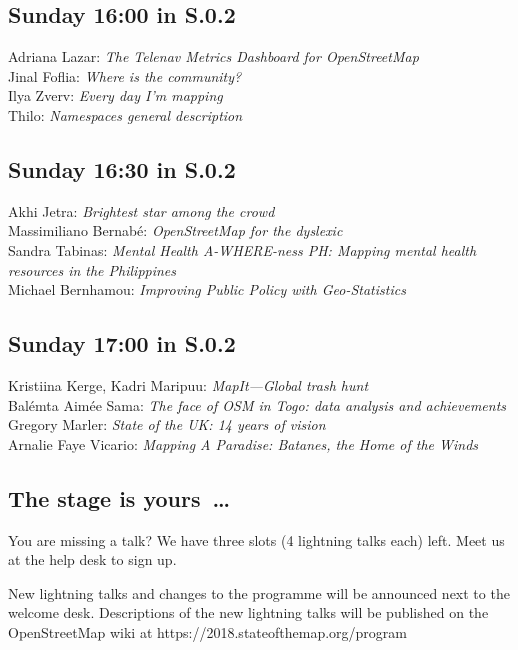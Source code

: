 \subsection*{Sunday 16:00 in S.0.2}
Adriana Lazar: \emph{The Telenav Metrics Dashboard for OpenStreetMap}\\
Jinal Foflia: \emph{Where is the community?}\\
Ilya Zverv: \emph{Every day I'm mapping}\\
Thilo: \emph{Namespaces general description}

\subsection*{Sunday 16:30 in S.0.2}
Akhi Jetra: \emph{Brightest star among the crowd}\\
Massimiliano Bernabé: \emph{OpenStreetMap for the dyslexic}\\
Sandra Tabinas: \emph{Mental Health A-WHERE-ness PH: Mapping mental health resources in the Philippines}\\
Michael Bernhamou: \emph{Improving Public Policy with Geo-Statistics}

\subsection*{Sunday 17:00 in S.0.2}
Kristiina Kerge, Kadri Maripuu: \emph{MapIt---Global trash hunt}\\
Balémta Aimée Sama: \emph{The face of OSM in Togo: data analysis and achievements}\\
Gregory Marler: \emph{State of the UK: 14 years of vision}\\
Arnalie Faye Vicario: \emph{Mapping A Paradise: Batanes, the Home of the Winds}

\subsection*{The stage is yours~\dots}

You are missing a talk? We have three slots (4 lightning talks each) left. Meet us at the help desk to
sign up.

New lightning talks and changes to the programme will be announced next to the welcome desk. Descriptions of the new lightning talks will be published on the OpenStreetMap wiki at \mbox{https://2018.stateofthemap.org/program}
